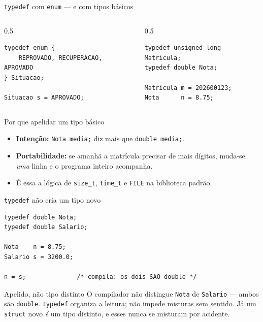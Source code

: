 \documentclass[aspectratio=169]{beamer}
\begin{document}
\begin{frame}[fragile]{\texttt{typedef} com \texttt{enum} --- e com tipos básicos}
\begin{columns}[T]
\begin{column}{0.5\textwidth}
\begin{lstlisting}[basicstyle=\ttfamily\scriptsize]
typedef enum {
    REPROVADO, RECUPERACAO, APROVADO
} Situacao;

Situacao s = APROVADO;
\end{lstlisting}
\end{column}
\begin{column}{0.5\textwidth}
\begin{lstlisting}[basicstyle=\ttfamily\scriptsize]
typedef unsigned long Matricula;
typedef double Nota;

Matricula m = 202600123;
Nota      n = 8.75;
\end{lstlisting}
\end{column}
\end{columns}
  \begin{block}{Por que apelidar um tipo básico}
    \begin{itemize}
      \item \textbf{Intenção:} \texttt{Nota media;} diz mais que \texttt{double media;}.
      \item \textbf{Portabilidade:} se amanhã a matrícula precisar de mais
        dígitos, muda-se \emph{uma} linha e o programa inteiro acompanha.
      \item É essa a lógica de \texttt{size\_t}, \texttt{time\_t} e
        \texttt{FILE} na biblioteca padrão.
    \end{itemize}
  \end{block}
\end{frame}

\begin{frame}[fragile]{\texttt{typedef} não cria um tipo novo}
\begin{lstlisting}[basicstyle=\ttfamily\scriptsize]
typedef double Nota;
typedef double Salario;

Nota    n = 8.75;
Salario s = 3200.0;

n = s;              /* compila: os dois SAO double */
\end{lstlisting}
  \begin{alertblock}{Apelido, não tipo distinto}
    O compilador não distingue \texttt{Nota} de \texttt{Salario} --- ambos são
    \texttt{double}. \texttt{typedef} organiza a leitura; não impede misturas
    sem sentido. Já um \texttt{struct} novo \emph{é} um tipo distinto, e esses
    nunca se misturam por acidente.
  \end{alertblock}
\end{frame}
\end{document}

